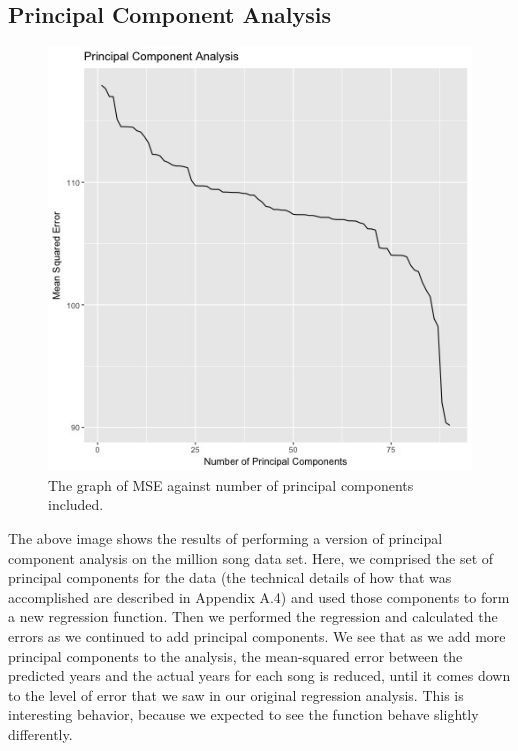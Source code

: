 \documentclass{article}
\begin{document}
\subsection{Principal Component Analysis}

\begin{figure}[H]
    \begin{center}
        \includegraphics[width=\textwidth]{principalComponent.jpg}
    \end{center}
  \caption{The graph of MSE against number of principal components included.}
\end{figure}

The above image shows the results of performing a version of principal component analysis on the million song data set.  Here, we comprised the set of principal components for the data (the technical details of how that was accomplished are described in Appendix A.4) and used those components to form a new regression function.  Then we performed the regression and calculated the errors as we continued to add principal components.  We see that as we add more principal components to the analysis, the mean-squared error between the predicted years and the actual years for each song is reduced, until it comes down to the level of error that we saw in our original regression analysis.  This is interesting behavior, because we expected to see the function behave slightly differently.
\end{document}
